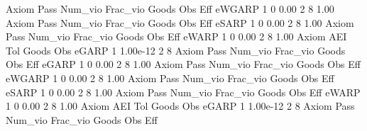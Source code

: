 {\smallskip}
{\smallskip}
{\smallskip}
       Axiom {\VBAR} Pass     Num_vio    Frac_vio       Goods         Obs         Eff  
      eWGARP {\VBAR}    1           0        0.00           2           8        1.00  
{\smallskip}
{\smallskip}
{\smallskip}
       Axiom {\VBAR} Pass     Num_vio    Frac_vio       Goods         Obs         Eff  
       eSARP {\VBAR}    1           0        0.00           2           8        1.00  
{\smallskip}
{\smallskip}
{\smallskip}
       Axiom {\VBAR} Pass     Num_vio    Frac_vio       Goods         Obs         Eff  
       eWARP {\VBAR}    1           0        0.00           2           8        1.00  
{\smallskip}
       Axiom {\VBAR}       AEI        Tol      Goods        Obs 
       eGARP {\VBAR}         1   1.00e-12          2          8 
{\smallskip}
{\smallskip}
{\smallskip}
       Axiom {\VBAR} Pass     Num_vio    Frac_vio       Goods         Obs         Eff  
       eGARP {\VBAR}    1           0        0.00           2           8        1.00  
{\smallskip}
{\smallskip}
{\smallskip}
       Axiom {\VBAR} Pass     Num_vio    Frac_vio       Goods         Obs         Eff  
      eWGARP {\VBAR}    1           0        0.00           2           8        1.00  
{\smallskip}
{\smallskip}
{\smallskip}
       Axiom {\VBAR} Pass     Num_vio    Frac_vio       Goods         Obs         Eff  
       eSARP {\VBAR}    1           0        0.00           2           8        1.00  
{\smallskip}
{\smallskip}
{\smallskip}
       Axiom {\VBAR} Pass     Num_vio    Frac_vio       Goods         Obs         Eff  
       eWARP {\VBAR}    1           0        0.00           2           8        1.00  
{\smallskip}
       Axiom {\VBAR}       AEI        Tol      Goods        Obs 
       eGARP {\VBAR}         1   1.00e-12          2          8 
{\smallskip}
{\smallskip}
{\smallskip}
       Axiom {\VBAR} Pass     Num_vio    Frac_vio       Goods         Obs         Eff  
